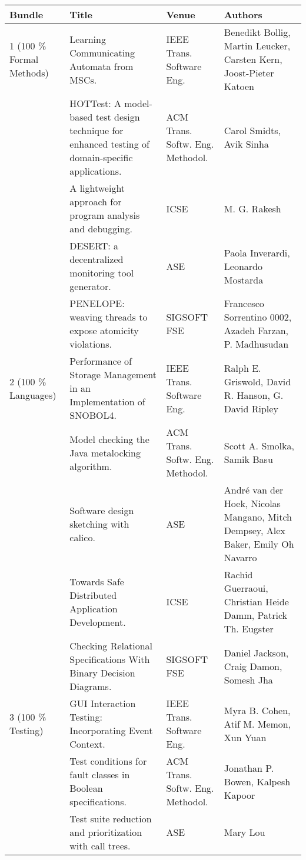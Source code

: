\begin{center}
\begin{longtable}{|p{}p{}p{}p{}|}
    \hline
    Bundle & Title & Venue & Authors \\
    \hline
\rowcolor{black!20}    1 (100 \% Formal Methods) & Learning Communicating Automata from MSCs.& IEEE 
Trans. Software 
Eng.& Benedikt Bollig, Martin Leucker, Carsten Kern, Joost-Pieter Katoen \\
	& HOTTest: A model-based test design technique for enhanced testing of domain-specific 
applications.& ACM Trans. Softw. Eng. Methodol.& Carol Smidts, Avik Sinha \\
\rowcolor{black!20}	& A lightweight approach for program analysis and debugging.& ICSE& M. G. 
Rakesh \\
	& DESERT: a decentralized monitoring tool generator.& ASE& Paola Inverardi, Leonardo 
Mostarda \\
\rowcolor{black!20}	& PENELOPE: weaving threads to expose atomicity violations.& SIGSOFT FSE& 
Francesco Sorrentino 0002, Azadeh Farzan, P. Madhusudan \\
    2 (100 \% Languages) & Performance of Storage Management in an Implementation of SNOBOL4.& IEEE 
Trans. Software 
Eng.& Ralph E. Griswold, David R. Hanson, G. David Ripley \\
\rowcolor{black!20}	& Model checking the Java metalocking algorithm.& ACM Trans. Softw. Eng. 
Methodol.& Scott A. Smolka, Samik Basu \\
	& Software design sketching with calico.& ASE& André van der Hoek, Nicolas Mangano, Mitch 
Dempsey, Alex Baker, Emily Oh Navarro \\
\rowcolor{black!20}	& Towards Safe Distributed Application Development.& ICSE& Rachid 
Guerraoui, 
Christian Heide Damm, Patrick Th. Eugster \\
	& Checking Relational Specifications With Binary Decision Diagrams.& SIGSOFT FSE& Daniel 
Jackson, Craig Damon, Somesh Jha \\
\rowcolor{black!20}    3 (100 \% Testing) & GUI Interaction Testing: Incorporating Event Context.& 
IEEE 
Trans. 
Software Eng.& Myra B. Cohen, Atif M. Memon, Xun Yuan \\
	& Test conditions for fault classes in Boolean specifications.& ACM Trans. Softw. Eng. 
Methodol.& Jonathan P. Bowen, Kalpesh Kapoor \\
\rowcolor{black!20}	& Test suite reduction and prioritization with call trees.& ASE& Mary Lou 

\end{longtable}
\end{center}
